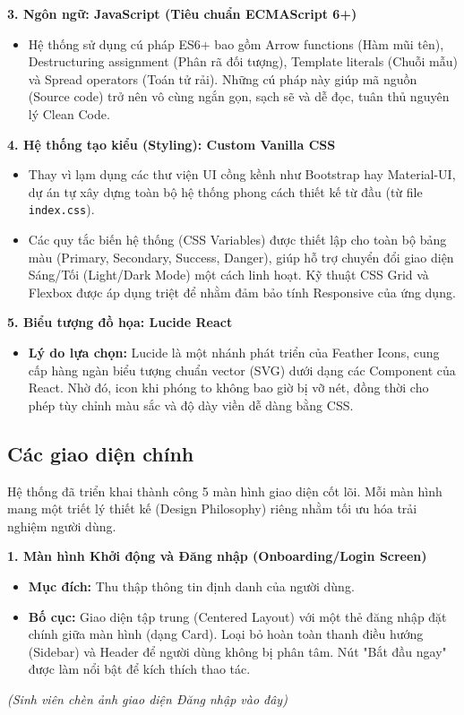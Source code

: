 \textbf{3. Ngôn ngữ: JavaScript (Tiêu chuẩn ECMAScript 6+)}
\begin{itemize}
    \item Hệ thống sử dụng cú pháp ES6+ bao gồm Arrow functions (Hàm mũi tên), Destructuring assignment (Phân rã đối tượng), Template literals (Chuỗi mẫu) và Spread operators (Toán tử rải). Những cú pháp này giúp mã nguồn (Source code) trở nên vô cùng ngắn gọn, sạch sẽ và dễ đọc, tuân thủ nguyên lý Clean Code.
\end{itemize}

\textbf{4. Hệ thống tạo kiểu (Styling): Custom Vanilla CSS}
\begin{itemize}
    \item Thay vì lạm dụng các thư viện UI cồng kềnh như Bootstrap hay Material-UI, dự án tự xây dựng toàn bộ hệ thống phong cách thiết kế từ đầu (từ file \texttt{index.css}). 
    \item Các quy tắc biến hệ thống (CSS Variables) được thiết lập cho toàn bộ bảng màu (Primary, Secondary, Success, Danger), giúp hỗ trợ chuyển đổi giao diện Sáng/Tối (Light/Dark Mode) một cách linh hoạt. Kỹ thuật CSS Grid và Flexbox được áp dụng triệt để nhằm đảm bảo tính Responsive của ứng dụng.
\end{itemize}

\textbf{5. Biểu tượng đồ họa: Lucide React}
\begin{itemize}
    \item \textbf{Lý do lựa chọn:} Lucide là một nhánh phát triển của Feather Icons, cung cấp hàng ngàn biểu tượng chuẩn vector (SVG) dưới dạng các Component của React. Nhờ đó, icon khi phóng to không bao giờ bị vỡ nét, đồng thời cho phép tùy chỉnh màu sắc và độ dày viền dễ dàng bằng CSS.
\end{itemize}

\subsection{Các giao diện chính}
Hệ thống đã triển khai thành công 5 màn hình giao diện cốt lõi. Mỗi màn hình mang một triết lý thiết kế (Design Philosophy) riêng nhằm tối ưu hóa trải nghiệm người dùng.

\textbf{1. Màn hình Khởi động và Đăng nhập (Onboarding/Login Screen)}
\begin{itemize}
    \item \textbf{Mục đích:} Thu thập thông tin định danh của người dùng.
    \item \textbf{Bố cục:} Giao diện tập trung (Centered Layout) với một thẻ đăng nhập đặt chính giữa màn hình (dạng Card). Loại bỏ hoàn toàn thanh điều hướng (Sidebar) và Header để người dùng không bị phân tâm. Nút "Bắt đầu ngay" được làm nổi bật để kích thích thao tác.
\end{itemize}
\textit{(Sinh viên chèn ảnh giao diện Đăng nhập vào đây)}

